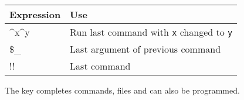 \begin{center}
  \begin{tabular} { l | l }
    Expression & Use \\
    \hline
    \textasciicircum{}x\textasciicircum{}y & Run last command with \texttt{x} changed to \texttt{y} \\
    \$\_ & Last argument of previous command \\
    !! & Last command \\
  \end{tabular}

\end{center}

The  key completes commands, files and can also be programmed.\\
